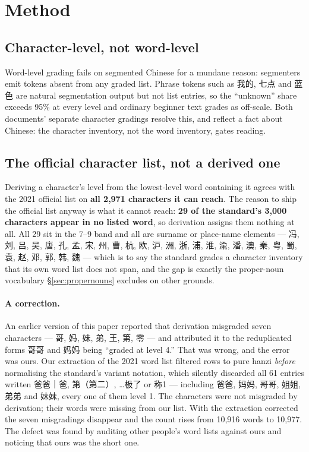\documentclass[11pt]{article}
\begin{document}
\section{Method}
\label{sec:method}

\subsection{Character-level, not word-level}
\label{sec:charlevel}

Word-level grading fails on segmented Chinese for a mundane reason: segmenters
emit tokens absent from any graded list. Phrase tokens such as 我的, 七点 and
蓝色 are natural segmentation output but not list entries, so the ``unknown''
share exceeds 95\% at every level and ordinary beginner text grades as
off-scale. Both documents' separate character gradings resolve this, and
reflect a fact about Chinese: the character inventory, not the word inventory,
gates reading.

\subsection{The official character list, not a derived one}

Deriving a character's level from the lowest-level word containing it agrees
with the 2021 official list on \textbf{all 2{,}971 characters it can reach}.
The reason to ship the official list anyway is what it cannot reach:
\textbf{29 of the standard's 3{,}000 characters appear in no listed word}, so
derivation assigns them nothing at all. All 29 sit in the 7--9 band and all are
surname or place-name elements --- 冯, 刘, 吕, 吴, 唐, 孔, 孟, 宋, 州, 曹, 杭,
欧, 沪, 洲, 浙, 浦, 淮, 渝, 潘, 澳, 秦, 粤, 蜀, 袁, 赵, 邓, 郭, 韩, 魏 --- which
is to say the standard grades a character inventory that its own word list does
not span, and the gap is exactly the proper-noun vocabulary
\S\ref{sec:propernouns} excludes on other grounds.

\paragraph{A correction.} An earlier version of this paper reported that
derivation misgraded seven characters --- 哥, 妈, 妹, 弟, 王, 第, 零 --- and
attributed it to the reduplicated forms 哥哥 and 妈妈 being ``graded at level
4.'' That was wrong, and the error was ours. Our extraction of the 2021 word
list filtered rows to pure hanzi \emph{before} normalising the standard's
variant notation, which silently discarded all 61 entries written 爸爸｜爸,
第（第二）, …极了 or 称1 --- including 爸爸, 妈妈, 哥哥, 姐姐, 弟弟 and 妹妹,
every one of them level 1. The characters were not misgraded by derivation;
their words were missing from our list. With the extraction corrected the
seven misgradings disappear and the count rises from 10{,}916 words to
10{,}977. The defect was found by auditing other people's word lists against
ours and noticing that ours was the short one.
\end{document}
